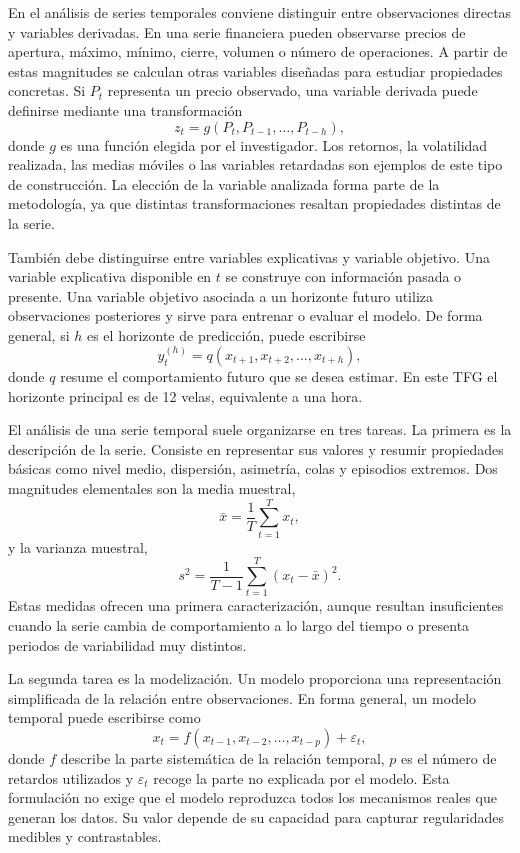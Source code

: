 En el análisis de series temporales conviene distinguir entre observaciones directas y variables derivadas. En una serie financiera pueden observarse precios de apertura, máximo, mínimo, cierre, volumen o número de operaciones. A partir de estas magnitudes se calculan otras variables diseñadas para estudiar propiedades concretas. Si \(P_t\) representa un precio observado, una variable derivada puede definirse mediante una transformación
\begin{equation}
    z_t = g(P_t, P_{t-1}, \ldots, P_{t-h}),
\end{equation}
donde \(g\) es una función elegida por el investigador. Los retornos, la volatilidad realizada, las medias móviles o las variables retardadas son ejemplos de este tipo de construcción. La elección de la variable analizada forma parte de la metodología, ya que distintas transformaciones resaltan propiedades distintas de la serie.

También debe distinguirse entre variables explicativas y variable objetivo. Una variable explicativa disponible en \(t\) se construye con información pasada o presente. Una variable objetivo asociada a un horizonte futuro utiliza observaciones posteriores y sirve para entrenar o evaluar el modelo. De forma general, si \(h\) es el horizonte de predicción, puede escribirse
\begin{equation}
    y_t^{(h)} = q(x_{t+1}, x_{t+2}, \ldots, x_{t+h}),
\end{equation}
donde \(q\) resume el comportamiento futuro que se desea estimar. En este TFG el horizonte principal es de 12 velas, equivalente a una hora.

El análisis de una serie temporal suele organizarse en tres tareas. La primera es la descripción de la serie. Consiste en representar sus valores y resumir propiedades básicas como nivel medio, dispersión, asimetría, colas y episodios extremos. Dos magnitudes elementales son la media muestral,
\begin{equation}
    \bar{x} = \frac{1}{T}\sum_{t=1}^{T} x_t,
\end{equation}
y la varianza muestral,
\begin{equation}
    s^2 = \frac{1}{T-1}\sum_{t=1}^{T}(x_t-\bar{x})^2.
\end{equation}
Estas medidas ofrecen una primera caracterización, aunque resultan insuficientes cuando la serie cambia de comportamiento a lo largo del tiempo o presenta periodos de variabilidad muy distintos.

La segunda tarea es la modelización. Un modelo proporciona una representación simplificada de la relación entre observaciones. En forma general, un modelo temporal puede escribirse como
\begin{equation}
    x_t = f(x_{t-1}, x_{t-2}, \ldots, x_{t-p}) + \varepsilon_t,
\end{equation}
donde \(f\) describe la parte sistemática de la relación temporal, \(p\) es el número de retardos utilizados y \(\varepsilon_t\) recoge la parte no explicada por el modelo. Esta formulación no exige que el modelo reproduzca todos los mecanismos reales que generan los datos. Su valor depende de su capacidad para capturar regularidades medibles y contrastables.

